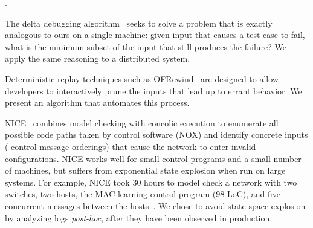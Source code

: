

. 


The delta debugging algorithm~\cite{Zeller:2002:SIF:506201.506206} seeks to solve
a problem that is exactly analogous to ours on a single machine: given input that causes a test case
to fail, what is the minimum subset of the input that still produces the failure?
We apply the same reasoning to a distributed system.


Deterministic replay techniques such as OFRewind~\cite{ofrewind}
are designed to allow developers to interactively prune
the inputs that lead up to errant behavior. We present an algorithm that
automates this process.


NICE~\cite{nice} combines model checking with concolic execution
to enumerate all possible code paths taken by control software (NOX)
and identify concrete inputs (\eg{} control message orderings) that cause
the network to enter invalid configurations. NICE works well for small
control programs and a small number of machines, but suffers from exponential
state explosion when run on large systems. For example, NICE took 30 hours to
model check a network with two switches, two hosts, the MAC-learning
control program (98 LoC), and five concurrent
messages between the hosts~\cite{nice}. We chose to avoid state-space explosion by analyzing logs
{\em post-hoc}, after they have been observed in production.



